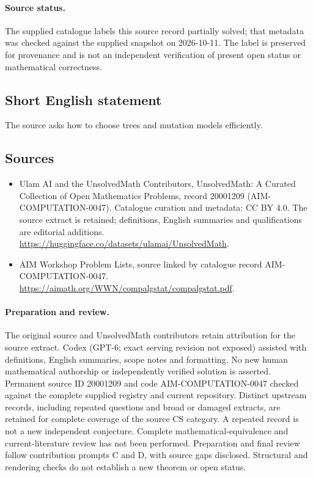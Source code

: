 \documentclass[11pt]{article}
\begin{document}
\paragraph{Source status.}
The supplied catalogue labels this source record partially solved; that metadata was checked against the supplied snapshot on 2026-10-11. The label is preserved for provenance and is not an independent verification of present open status or mathematical correctness.
\subsection{Short English statement}
The source asks how to choose trees and mutation models efficiently.
\subsection{Sources}
\begin{itemize}
\item[\hypertarget{source:20001209:1}{S1}] Ulam AI and the UnsolvedMath Contributors, UnsolvedMath: A Curated Collection of Open Mathematics Problems, record 20001209 (AIM-COMPUTATION-0047). Catalogue curation and metadata: CC BY 4.0. The source extract is retained; definitions, English summaries and qualifications are editorial additions.
\url{https://huggingface.co/datasets/ulamai/UnsolvedMath}.
\item[\hypertarget{source:20001209:2}{S2}] AIM Workshop Problem Lists, source linked by catalogue record AIM-COMPUTATION-0047.
\url{https://aimath.org/WWN/compalgstat/compalgstat.pdf}.
\end{itemize}
\paragraph{Preparation and review.}
The original source and UnsolvedMath contributors retain attribution for the source extract. Codex (GPT-6; exact serving revision not exposed) assisted with definitions, English summaries, scope notes and formatting. No new human mathematical authorship or independently verified solution is asserted. Permanent source ID 20001209 and code AIM-COMPUTATION-0047 checked against the complete supplied registry and current repository. Distinct upstream records, including repeated questions and broad or damaged extracts, are retained for complete coverage of the source CS category. A repeated record is not a new independent conjecture. Complete mathematical-equivalence and current-literature review has not been performed. Preparation and final review follow contribution prompts C and D, with source gaps disclosed. Structural and rendering checks do not establish a new theorem or open status.
\label{end:20001209}
\end{document}
